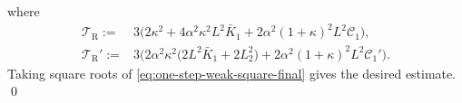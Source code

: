 \documentclass[12pt]{article}
\newenvironment{redtext}
  {\color{black}\ignorespaces}
  {\ignorespacesafterend}
\numberwithin{equation}{section}
\renewenvironment{proof}%
  {\begin{trivlist}%
   \item[]\ignorespaces}%
  {\qed\end{trivlist}}
\begin{document}
\begin{proof}
\begin{equation}
\end{equation}
where
\begin{equation}
\label{eq:weak-local-constants-final}
\begin{aligned}
\mathcal T_{\mathrm{R}}
:=&
3
\Big(
2\kappa^2
+
4\alpha^2\kappa^2L^2\bar K_1
+
2\alpha^2(1+\kappa)^2L^2\mathcal C_1
\Big),
\\
\mathcal T_{\mathrm{R}}'
:=&
3
\Big(
2\alpha^2\kappa^2
\big(
2L^2\bar K_1+2L_2^2
\big)
+
2\alpha^2(1+\kappa)^2L^2\mathcal C_1'
\Big).
\end{aligned}
\end{equation}
Taking square roots of \eqref{eq:one-step-weak-square-final} gives the desired estimate.
\end{proof}


\begin{redtext}


\end{redtext}
\end{document}
